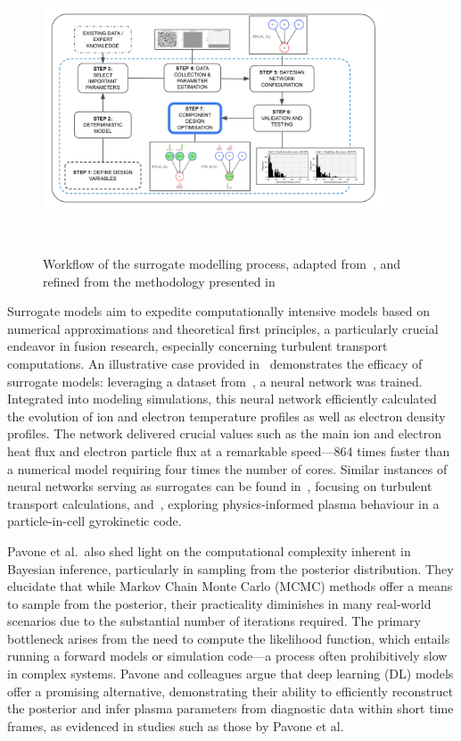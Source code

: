 \documentclass[journal]{IEEEtran}
\begin{document}
\begin{figure}[t]
    \centering
    \includegraphics[width=0.9\textwidth]{figures/methodology/workflows/workflow_v5.png}
    \caption{Workflow of the surrogate modelling process, adapted from~\cite{Conti2019}, and refined from the methodology presented in~\cite{Griffiths2024}}~\label{fig:workflow}
\end{figure}


Surrogate models aim to expedite computationally intensive models based on numerical approximations and theoretical first principles, a particularly crucial endeavor in fusion research, especially concerning turbulent transport computations. An illustrative case provided in~\cite{Van2020} demonstrates the efficacy of surrogate models: leveraging a dataset from~\cite{Citrin2017}, a neural network was trained. Integrated into modeling simulations, this neural network efficiently calculated the evolution of ion and electron temperature profiles as well as electron density profiles. The network delivered crucial values such as the main ion and electron heat flux and electron particle flux at a remarkable speed—864 times faster than a numerical model requiring four times the number of cores. Similar instances of neural networks serving as surrogates can be found in~\cite{Meneghini2017}, focusing on turbulent transport calculations, and~\cite{Miller2021}, exploring physics-informed plasma behaviour in a particle-in-cell gyrokinetic code.

Pavone et al.\ also shed light on the computational complexity inherent in Bayesian inference, particularly in sampling from the posterior distribution. They elucidate that while Markov Chain Monte Carlo (MCMC) methods offer a means to sample from the posterior, their practicality diminishes in many real-world scenarios due to the substantial number of iterations required. The primary bottleneck arises from the need to compute the likelihood function, which entails running a forward models or simulation code—a process often prohibitively slow in complex systems. Pavone and colleagues argue that deep learning (DL) models offer a promising alternative, demonstrating their ability to efficiently reconstruct the posterior and infer plasma parameters from diagnostic data within short time frames, as evidenced in studies such as those by Pavone et al.~\cite{Pavone2018,Pavone2019, Pavone2020, Pavone2021}
\end{document}
